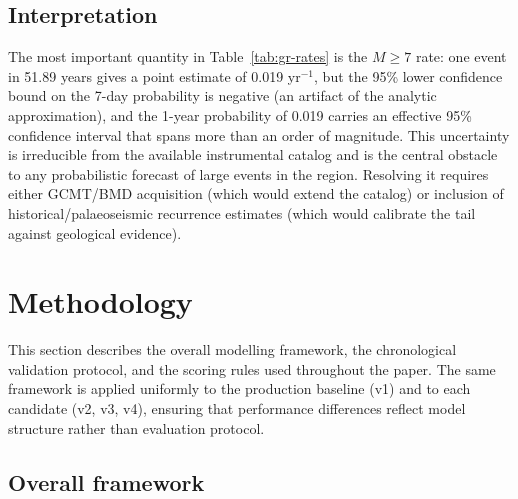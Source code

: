 \documentclass[10pt,a4paper,twocolumn]{article}
\begin{document}
\subsection{Interpretation}

The most important quantity in Table~\ref{tab:gr-rates} is the $M\geq7$ rate: one event in 51.89 years gives a point estimate of 0.019 yr$^{-1}$, but the 95\% lower confidence bound on the 7-day probability is negative (an artifact of the analytic approximation), and the 1-year probability of 0.019 carries an effective 95\% confidence interval that spans more than an order of magnitude. This uncertainty is irreducible from the available instrumental catalog and is the central obstacle to any probabilistic forecast of large events in the region. Resolving it requires either GCMT/BMD acquisition (which would extend the catalog) or inclusion of historical/palaeoseismic recurrence estimates (which would calibrate the tail against geological evidence).

\section{Methodology}\label{sec:methodology}

This section describes the overall modelling framework, the chronological validation protocol, and the scoring rules used throughout the paper. The same framework is applied uniformly to the production baseline (v1) and to each candidate (v2, v3, v4), ensuring that performance differences reflect model structure rather than evaluation protocol.

\subsection{Overall framework}
\end{document}
